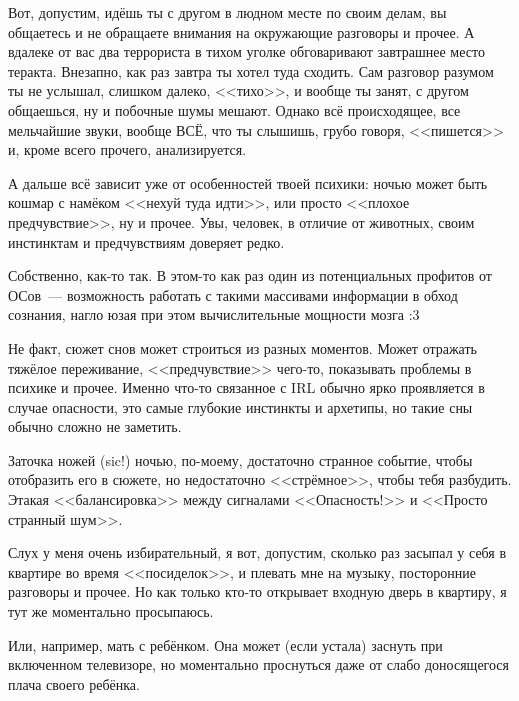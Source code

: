 \documentclass[a5paper,12pt,twoside]{memoir}
\begin{document}
Вот, допустим, идёшь ты с другом в людном месте по своим делам, вы общаетесь и не обращаете внимания на окружающие разговоры и прочее. А вдалеке от вас два террориста в тихом уголке обговаривают завтрашнее место теракта. Внезапно, как раз завтра ты хотел туда сходить. Сам разговор разумом ты не услышал, слишком далеко, <<тихо>>, и вообще ты занят, с другом общаешься, ну и побочные шумы мешают. Однако всё происходящее, все мельчайшие звуки, вообще ВСЁ, что ты слышишь, грубо говоря, <<пишется>> и, кроме всего прочего, анализируется.

А дальше всё зависит уже от особенностей твоей психики: ночью может быть кошмар с намёком <<нехуй туда идти>>, или просто <<плохое предчувствие>>, ну и прочее. Увы, человек, в отличие от животных, своим инстинктам и предчувствиям доверяет редко. 

Собственно, как-то так. В этом-то как раз один из потенциальных профитов от ОСов~--- возможность работать с такими массивами информации в обход сознания, нагло юзая при этом вычислительные мощности мозга :3

\bigskip


\medskip
Не факт, сюжет снов может строиться из разных моментов. Может отражать тяжёлое переживание, <<предчувствие>> чего-то, показывать проблемы в психике и прочее. Именно что-то связанное с IRL обычно ярко проявляется в случае опасности, это самые глубокие инстинкты и архетипы, но такие сны обычно сложно не заметить.
 
Заточка ножей (sic!) ночью, по-моему, достаточно странное событие, чтобы отобразить его в сюжете, но недостаточно <<стрёмное>>, чтобы тебя разбудить. Этакая <<балансировка>> между сигналами <<Опасность!>> и <<Просто странный шум>>.

Слух у меня очень избирательный, я вот, допустим, сколько раз засыпал у себя в квартире во время <<посиделок>>, и плевать мне на музыку, посторонние разговоры и прочее. Но как только кто-то открывает входную дверь в квартиру, я тут же моментально просыпаюсь. 

Или, например, мать с ребёнком. Она может (если устала) заснуть при включенном телевизоре, но моментально проснуться даже от слабо доносящегося плача своего ребёнка. 
\end{document}
